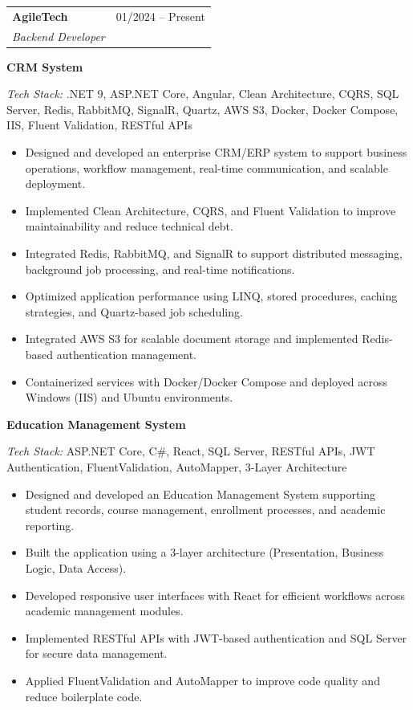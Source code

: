 \documentclass[a4paper,10pt]{article}
\makeatletter
\newcommand{\cventry}[4]{%
    \noindent
    \begin{tabularx}{\linewidth}{@{}X r@{}}
        \textbf{\color{darktext}#1} & \textcolor{lighttext}{\small #2} \\
        \textit{\color{primary}#3} & \\
    \end{tabularx}
    \vspace{-0.3em}
    #4
    \vspace{0.5em}
}
\newcommand{\projectentry}[2]{%
    \noindent
    \textbf{\color{darktext}#1}
    \vspace{-0.3em}
    #2
    \vspace{0.5em}
}
\newcommand{\techstack}[1]{%
    \vspace{-0.3em}
    \noindent\textcolor{lighttext}{\small\textit{Tech Stack:} #1}
    \vspace{0.2em}
}
\makeatother
\begin{document}
\cventry{AgileTech}{01/2024 -- Present}{Backend Developer}{

    \projectentry{CRM System}{
        \techstack{.NET 9, ASP.NET Core, Angular, Clean Architecture, CQRS, SQL Server, Redis, RabbitMQ, SignalR, Quartz, AWS S3, Docker, Docker Compose, IIS, Fluent Validation, RESTful APIs}

        \begin{itemize}[leftmargin=1.2em, itemsep=0.1em, topsep=0.2em]
            \item Designed and developed an enterprise CRM/ERP system to support business operations, workflow management, real-time communication, and scalable deployment.
            \item Implemented Clean Architecture, CQRS, and Fluent Validation to improve maintainability and reduce technical debt.
            \item Integrated Redis, RabbitMQ, and SignalR to support distributed messaging, background job processing, and real-time notifications.
            \item Optimized application performance using LINQ, stored procedures, caching strategies, and Quartz-based job scheduling.
            \item Integrated AWS S3 for scalable document storage and implemented Redis-based authentication management.
            \item Containerized services with Docker/Docker Compose and deployed across Windows (IIS) and Ubuntu environments.
        \end{itemize}
    }

    \projectentry{Education Management System}{
        \techstack{ASP.NET Core, C\#, React, SQL Server, RESTful APIs, JWT Authentication, FluentValidation, AutoMapper, 3-Layer Architecture}

        \begin{itemize}[leftmargin=1.2em, itemsep=0.1em, topsep=0.2em]
            \item Designed and developed an Education Management System supporting student records, course management, enrollment processes, and academic reporting.
            \item Built the application using a 3-layer architecture (Presentation, Business Logic, Data Access).
            \item Developed responsive user interfaces with React for efficient workflows across academic management modules.
            \item Implemented RESTful APIs with JWT-based authentication and SQL Server for secure data management.
            \item Applied FluentValidation and AutoMapper to improve code quality and reduce boilerplate code.
        \end{itemize}
    }
}
\end{document}
